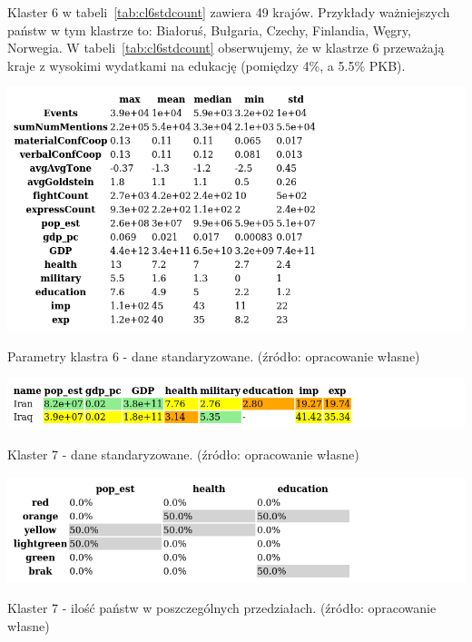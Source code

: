 \documentclass[11pt]{report}
\begin{document}
    Klaster 6 w tabeli~\ref{tab:cl6stdcount} zawiera 49 krajów.
    Przykłady ważniejszych państw w tym klastrze to: Białoruś, Bułgaria, Czechy, Finlandia, Węgry, Norwegia.
    W tabeli~\ref{tab:cl6stdcount} obserwujemy, że w klastrze 6 przeważają kraje z wysokimi wydatkami na edukację (pomiędzy 4\%, a 5.5\% PKB).

    \begin{table}[!htp]
        \centering
        \includegraphics[width=\linewidth]{tables/CLUST/desc/clust6std_desc.png}
        \caption{Parametry klastra 6 - dane standaryzowane. (źródło: opracowanie własne)}
        \label{tab:cl6std_desc}
    \end{table}

    \begin{table}[!htp]
        \centering
        \includegraphics[width=\linewidth]{tables/CLUST/cluster7stdkmeans.png}
        \caption{Klaster 7 - dane standaryzowane. (źródło: opracowanie własne)}
        \label{tab:cl7std}
    \end{table}

    \begin{table}[!htp]
        \centering
        \includegraphics[width=\linewidth]{tables/CLUST/cluster7stdkmeanscount.png}
        \caption{Klaster 7 - ilość państw w poszczególnych przedziałach. (źródło: opracowanie własne)}
        \label{tab:cl7stdcount}
    \end{table}
\end{document}
